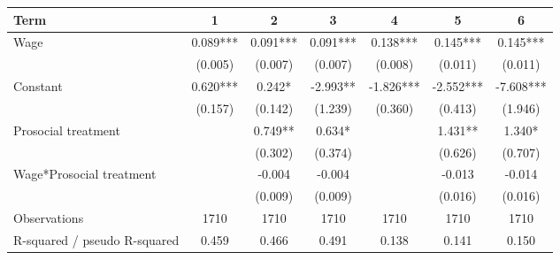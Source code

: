 \begin{tabular}{lcccccc}
\hline
Term & 1 & 2 & 3 & 4 & 5 & 6 \\
\hline
Wage & 0.089*** & 0.091*** & 0.091*** & 0.138*** & 0.145*** & 0.145*** \\
 & (0.005) & (0.007) & (0.007) & (0.008) & (0.011) & (0.011) \\
Constant & 0.620*** & 0.242* & -2.993** & -1.826*** & -2.552*** & -7.608*** \\
 & (0.157) & (0.142) & (1.239) & (0.360) & (0.413) & (1.946) \\
Prosocial treatment &  & 0.749** & 0.634* &  & 1.431** & 1.340* \\
 &  & (0.302) & (0.374) &  & (0.626) & (0.707) \\
Wage*Prosocial treatment &  & -0.004 & -0.004 &  & -0.013 & -0.014 \\
 &  & (0.009) & (0.009) &  & (0.016) & (0.016) \\
Observations & 1710 & 1710 & 1710 & 1710 & 1710 & 1710 \\
R-squared / pseudo R-squared & 0.459 & 0.466 & 0.491 & 0.138 & 0.141 & 0.150 \\
\hline
\end{tabular}
